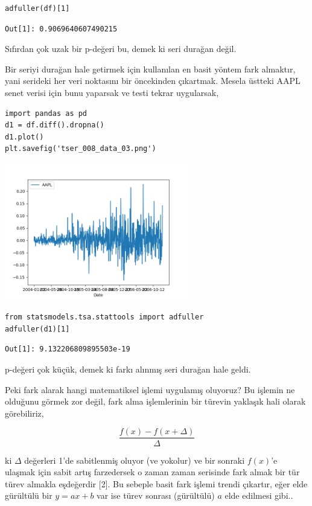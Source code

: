\documentclass[12pt,fleqn]{article}\usepackage{../../common}
\begin{document}
\begin{verbatim}
adfuller(df)[1]
\end{verbatim}

\begin{verbatim}
Out[1]: 0.9069640607490215
\end{verbatim}

Sıfırdan çok uzak bir p-değeri bu, demek ki seri durağan değil.

Bir seriyi durağan hale getirmek için kullanılan en basit yöntem fark almaktır,
yani serideki her veri noktasını bir öncekinden çıkartmak. Mesela üstteki AAPL
senet verisi için bunu yaparsak ve testi tekrar uygularsak,

\begin{verbatim}
import pandas as pd
d1 = df.diff().dropna()
d1.plot()
plt.savefig('tser_008_data_03.png')
\end{verbatim}

\includegraphics[height=6cm]{tser_008_data_03.png}

\begin{verbatim}
from statsmodels.tsa.stattools import adfuller
adfuller(d1)[1]
\end{verbatim}

\begin{verbatim}
Out[1]: 9.132206809895503e-19
\end{verbatim}

p-değeri çok küçük, demek ki farkı alınmış seri durağan hale geldi.

Peki fark alarak hangi matematiksel işlemi uygulamış oluyoruz? Bu işlemin ne
olduğunu görmek zor değil, fark alma işlemlerinin bir türevin yaklaşık hali
olarak görebiliriz,

$$
\frac{f(x)-f(x+\Delta)}{\Delta}
$$

ki $\Delta$ değerleri 1'de sabitlenmiş oluyor (ve yokolur) ve bir sonraki
$f(x)$'e ulaşmak için sabit artış farzedersek o zaman zaman serisinde fark almak
bir tür türev almakla eşdeğerdir [2]. Bu sebeple basit fark işlemi trendi
çıkartır, eğer elde gürültülü bir $y = ax + b$ var ise türev sonrası (gürültülü)
$a$ elde edilmesi gibi..
\end{document}
